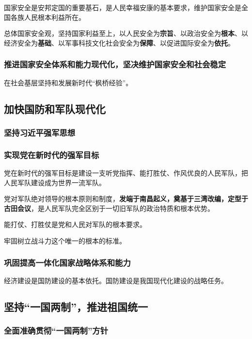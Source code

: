 \documentclass[12pt, a4paper, oneside]{ctexart}
\begin{document}
国家安全是安邦定国的重要基石，是人民幸福安康的基本要求，维护国家安全是全国各族人民根本利益所在。

总体国家安全观，坚持国家利益至上，以人民安全为\textbf{宗旨}、以政治安全为\textbf{根本}、以经济安全为\textbf{基础}、以军事科技文化社会安全为\textbf{保障}、以促进国际安全为\textbf{依托}。

\subsubsection{推进国家安全体系和能力现代化，坚决维护国家安全和社会稳定}

在社会基层坚持和发展新时代“枫桥经验”。

\subsection{加快国防和军队现代化}

\subsubsection{坚持习近平强军思想}

\subsubsection{实现党在新时代的强军目标}

党在新时代的强军目标是建设一支听党指挥、能打胜仗、作风优良的人民军队，把人民军队建设成为世界一流军队。

党对军队绝对领导的根本原则和制度，\textbf{发端于南昌起义，奠基于三湾改编，定型于古田会议}，是人民军队完全区别于一切旧军队的政治特质和根本优势。

能打仗、打胜仗是党和人民对军队的根本要求。

牢固树立战斗力这个唯一的根本的标准。

\subsubsection{巩固提高一体化国家战略体系和能力}

经济建设是国防建设的基本依托。国防建设是我国现代化建设的战略任务。

\subsection{坚持“一国两制”，推进祖国统一}

\subsubsection{全面准确贯彻“一国两制”方针}
\end{document}
